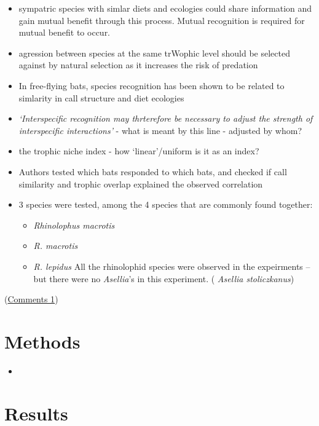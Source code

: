 \documentclass[
]{book}
\providecommand{\tightlist}{%
  \setlength{\itemsep}{0pt}\setlength{\parskip}{0pt}}
\begin{document}
\begin{itemize}
\tightlist
\item
  sympatric species with simlar diets and ecologies could share information and gain mutual benefit through this process. Mutual recognition is required for mutual benefit to occur.
\item
  agression between species at the same trWophic level should be selected against by natural selection as it increases the risk of predation
\item
  In free-flying bats, species recognition has been shown to be related to simlarity in call structure and diet ecologies
\item
  \emph{`Interspecific recognition may thrterefore be necessary to adjust the strength of interspecific interactions'} - what is meant by this line - adjusted by whom?
\item
  the trophic niche index - how `linear'/uniform is it as an index?
\item
  Authors tested which bats responded to which bats, and checked if call similarity and trophic overlap explained the observed correlation
\item
  3 species were tested, among the 4 species that are commonly found together:

  \begin{itemize}
  \tightlist
  \item
    \emph{Rhinolophus macrotis}
  \item
    \emph{R. macrotis}
  \item
    \emph{R. lepidus}
    All the rhinolophid species were observed in the expeirments --but there were no \emph{Asellia}'s in this experiment. ( \emph{Asellia stoliczkanus})
  \end{itemize}
\end{itemize}

(\protect\hyperlink{com_libehav}{Comments 1})

\hypertarget{methods-8}{%
\section{Methods}\label{methods-8}}

\begin{itemize}
\item
\end{itemize}

\hypertarget{results-8}{%
\section{Results}\label{results-8}}
\end{document}
